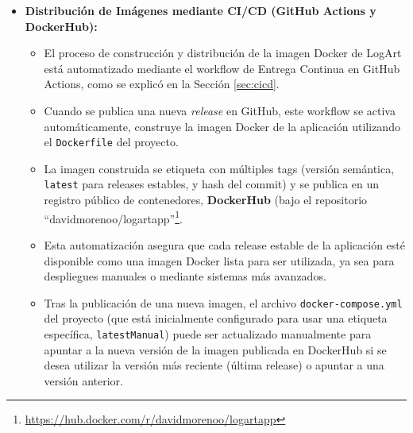\begin{itemize}
\begin{itemize}
        \item Configura las variables de entorno necesarias (cargadas desde un archivo \texttt{.env} para el servicio \texttt{app}), las redes para la comunicación entre contenedores, junto con los puertos expuestos.
        \item incluye \textit{healthchecks} para ambos servicios, asegurando un arranque ordenado y la correcta operatividad del sistema.
        \item Permite levantar todo el entorno con un simple comando (\texttt{docker-compose up}), lo que simplifica enormemente la configuración para cualquier desarrollador o para ejecutar la aplicación en un entorno de demostración. Las instrucciones detalladas para la ejecución se encuentran en el apéndice \ref{chap:apendiceConstruccion}.
    \end{itemize}
    \vspace{0.3cm}
    \item \textbf{Distribución de Imágenes mediante CI/CD (GitHub Actions y DockerHub):}
    \begin{itemize}
        \item El proceso de construcción y distribución de la imagen Docker de LogArt está automatizado mediante el workflow de Entrega Continua en GitHub Actions, como se explicó en la Sección \ref{sec:cicd}.
        \item Cuando se publica una nueva \textit{release} en GitHub, este workflow se activa automáticamente, construye la imagen Docker de la aplicación utilizando el \texttt{Dockerfile} del proyecto.
        \item La imagen construida se etiqueta con múltiples tags (versión semántica, \texttt{latest} para releases estables, y hash del commit) y se publica en un registro público de contenedores, \textbf{DockerHub} (bajo el repositorio ``davidmorenoo/logartapp''\footnote{\url{https://hub.docker.com/r/davidmorenoo/logartapp}}.
        \item Esta automatización asegura que cada release estable de la aplicación esté disponible como una imagen Docker lista para ser utilizada, ya sea para despliegues manuales o mediante sistemas más avanzados.
        \item Tras la publicación de una nueva imagen, el archivo \texttt{docker-compose.yml} del proyecto (que está inicialmente configurado para usar una etiqueta específica, \texttt{latestManual}) puede ser actualizado manualmente para apuntar a la nueva versión de la imagen publicada en DockerHub si se desea utilizar la versión más reciente (última release) o apuntar a una versión anterior.

\end{itemize}
\end{itemize}
